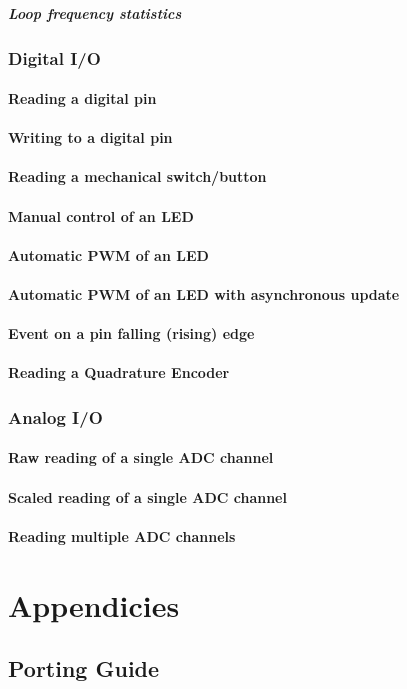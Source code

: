 \documentclass[12pt,letterpaper,article]{memoir} %
\begin{document}
\subsubsection{Loop frequency statistics}

\section{Digital I/O}
\subsection{Reading a digital pin}
\subsection{Writing to a digital pin}
\subsection{Reading a mechanical switch/button}
\subsection{Manual control of an LED}
\subsection{Automatic PWM of an LED}
\subsection{Automatic PWM of an LED with asynchronous update}
\subsection{Event on a pin falling (rising) edge}
\subsection{Reading a Quadrature Encoder}

\section{Analog I/O}
\subsection{Raw reading of a single ADC channel}
\subsection{Scaled reading of a single ADC channel}
\subsection{Reading multiple ADC channels}

\appendix
\part{Appendicies}
\chapter{Porting Guide}
\end{document}
